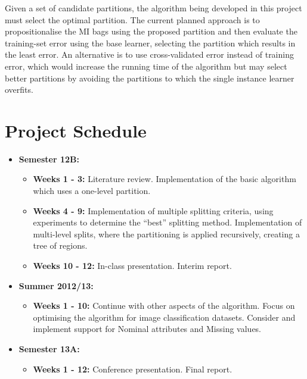\documentclass[a4paper,12pt]{article} %
\begin{document}
Given a set of candidate partitions, the algorithm being developed in this project must select the optimal partition. 
The current planned approach is to propositionalise the MI bags using the proposed partition and then evaluate the training-set error using the base learner, selecting the partition which results in the least error. An alternative is to use cross-validated error instead of training error, which would increase the running time of the algorithm but may select better partitions by avoiding the partitions to which the single instance learner overfits.


\section{Project Schedule}
\begin{itemize}

	\item {\bf Semester 12B:}
	\begin{itemize}
		\item {\bf Weeks 1 - 3:} Literature review. Implementation of the basic algorithm which uses a one-level partition.
		\item {\bf Weeks 4 - 9:} 
			Implementation of multiple splitting criteria, using experiments to determine the ``best'' splitting method.
			Implementation of multi-level splits, where the partitioning is applied recursively, creating a tree of regions.
		\item {\bf Weeks 10 - 12:} In-class presentation. Interim report.
	\end{itemize}

	\item {\bf Summer 2012/13:}
	\begin{itemize}
		\item {\bf Weeks 1 - 10:} 
			Continue with other aspects of the algorithm. 
			Focus on optimising the algorithm for image classification datasets.
			Consider and implement support for Nominal attributes and Missing values.
	\end{itemize}
	
	\item {\bf Semester 13A:}
	\begin{itemize}
		\item {\bf Weeks 1 - 12:} Conference presentation. Final report.
	\end{itemize}
\end{itemize}
\end{document}
